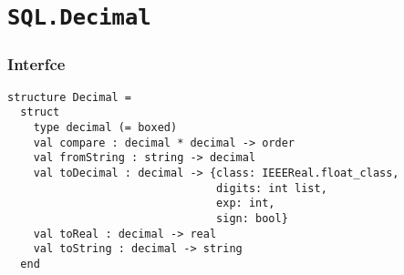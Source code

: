\documentclass{jbook}
\newcommand{\txt}[2]{#2}
\newcommand{\code}[1]{\mbox{\large\tt #1}}
\newcommand{\structure}[1]{
\section{{\tt #1}}\label{section:reference:#1}
}
\newcommand{\br}{\\}
\newcommand{\val}[2]{\code{val~#1~:~#2}\par}
\newcommand{\Interface}{\subsubsection*{\txt{インタフェイス}{Interfce}}}
\begin{document}

\structure{SQL.Decimal}

\Interface
\begin{verbatim}
structure Decimal =
  struct
    type decimal (= boxed)
    val compare : decimal * decimal -> order
    val fromString : string -> decimal
    val toDecimal : decimal -> {class: IEEEReal.float_class,
                                digits: int list,
                                exp: int,
                                sign: bool}
    val toReal : decimal -> real
    val toString : decimal -> string
  end
\end{verbatim}
\end{document}
